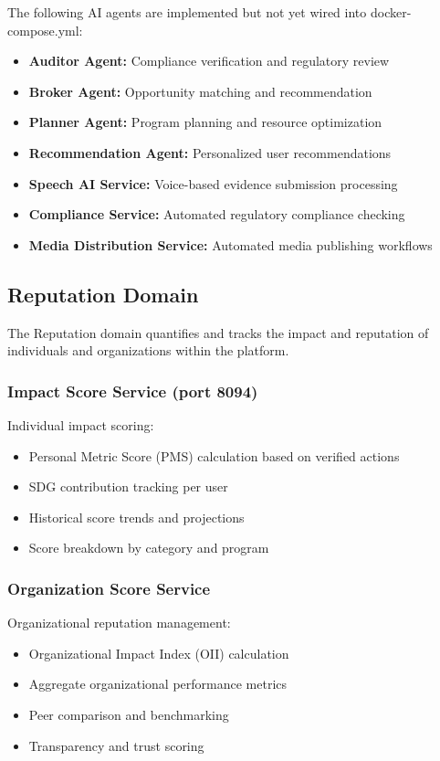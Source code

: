 \documentclass[11pt,a4paper]{article}
\begin{document}
The following AI agents are implemented but not yet wired into docker-compose.yml:
\begin{itemize}
  \item \textbf{Auditor Agent:} Compliance verification and regulatory review
  \item \textbf{Broker Agent:} Opportunity matching and recommendation
  \item \textbf{Planner Agent:} Program planning and resource optimization
  \item \textbf{Recommendation Agent:} Personalized user recommendations
  \item \textbf{Speech AI Service:} Voice-based evidence submission processing
  \item \textbf{Compliance Service:} Automated regulatory compliance checking
  \item \textbf{Media Distribution Service:} Automated media publishing workflows
\end{itemize}

\subsection{Reputation Domain}

The Reputation domain quantifies and tracks the impact and reputation of individuals and organizations within the platform.

\subsubsection{Impact Score Service (port 8094)}

Individual impact scoring:
\begin{itemize}
  \item Personal Metric Score (PMS) calculation based on verified actions
  \item SDG contribution tracking per user
  \item Historical score trends and projections
  \item Score breakdown by category and program
\end{itemize}

\subsubsection{Organization Score Service}

Organizational reputation management:
\begin{itemize}
  \item Organizational Impact Index (OII) calculation
  \item Aggregate organizational performance metrics
  \item Peer comparison and benchmarking
  \item Transparency and trust scoring
\end{itemize}
\end{document}
